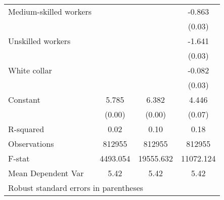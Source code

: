 {\begin{tabular}{l*{3}{c}}
Medium-skilled workers&                     &                     &      -0.863\sym{***}\\
                    &                     &                     &      (0.03)         \\
Unskilled workers   &                     &                     &      -1.641\sym{***}\\
                    &                     &                     &      (0.03)         \\
White collar        &                     &                     &      -0.082\sym{**} \\
                    &                     &                     &      (0.03)         \\
Constant            &       5.785\sym{***}&       6.382\sym{***}&       4.446\sym{***}\\
                    &      (0.00)         &      (0.00)         &      (0.07)         \\
\hline
R-squared           &        0.02         &        0.10         &        0.18         \\
Observations        &      812955         &      812955         &      812955         \\
F-stat              &    4493.054         &   19555.632         &   11072.124         \\
Mean Dependent Var  &        5.42         &        5.42         &        5.42         \\
\hline\hline
\multicolumn{4}{l}{\footnotesize Robust standard errors in parentheses}\\
\end{tabular}
}
